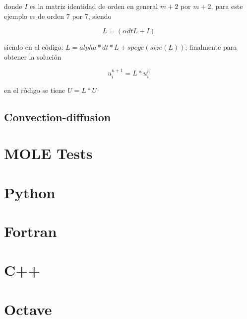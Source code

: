 \documentclass[a4paper,abstract=true]{scrreprt}
\begin{document}
donde $I$ es la matriz identidad de orden en general $m+2$ por $m+2$, para este ejemplo es de orden $7$ por $7$, siendo

$$  L = (\alpha dt L +I )$$

siendo en el código: $ L = alpha*dt*L + speye(size(L))$; finalmente  para obtener la solución

\begin{equation}
    u^{n+1}_{i} = L *u^{n}_{i}
\end{equation}

en el código se tiene $ U = L*U$


\section{Convection-diffusion}

\chapter{MOLE Tests}

\appendix

\chapter{Python}

\chapter{Fortran}

\chapter{C++}

\chapter{Octave}

\nocite{*}
\printbibliography[title={Referencias}]
\end{document}
